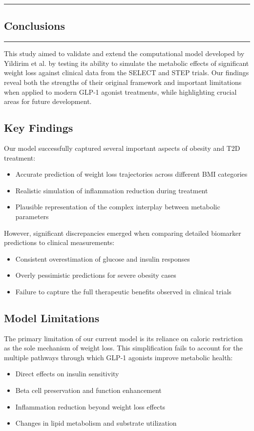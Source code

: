 {\color{gray}\hrule}
\begin{center}
\section{Conclusions}
\bigskip
\end{center}
{\color{gray}\hrule}
\vspace{0.5cm}
\begin{multicols}{2}
This study aimed to validate and extend the computational model developed by Yildirim et al.\cite{Yildirim2023} by testing its ability to simulate the metabolic effects of significant weight loss against clinical data from the SELECT and STEP trials. Our findings reveal both the strengths of their original framework and important limitations when applied to modern GLP-1 agonist treatments, while highlighting crucial areas for future development.

\subsection{Key Findings}
Our model successfully captured several important aspects of obesity and T2D treatment:
\begin{itemize}
    \item Accurate prediction of weight loss trajectories across different BMI categories
    \item Realistic simulation of inflammation reduction during treatment
    \item Plausible representation of the complex interplay between metabolic parameters
\end{itemize}

However, significant discrepancies emerged when comparing detailed biomarker predictions to clinical measurements:
\begin{itemize}
    \item Consistent overestimation of glucose and insulin responses
    \item Overly pessimistic predictions for severe obesity cases
    \item Failure to capture the full therapeutic benefits observed in clinical trials
\end{itemize}

\subsection{Model Limitations}
The primary limitation of our current model is its reliance on caloric restriction as the sole mechanism of weight loss. This simplification fails to account for the multiple pathways through which GLP-1 agonists improve metabolic health:
\begin{itemize}
    \item Direct effects on insulin sensitivity
    \item Beta cell preservation and function enhancement
    \item Inflammation reduction beyond weight loss effects
    \item Changes in lipid metabolism and substrate utilization
\end{itemize}


\end{multicols}
